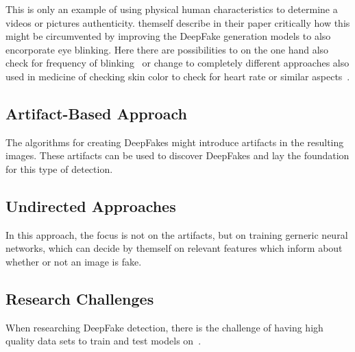 \par
This is only an example of using physical human characteristics to determine a
videos or pictures authenticity. \textcite{li_ictu_2018} themself describe in 
their paper critically how this might be circumvented by improving the DeepFake
generation models to also encorporate eye blinking. Here there are possibilities
to on the one hand also check for frequency of blinking~\cite{li_ictu_2018} or 
change to completely different approaches also used in medicine of checking skin
color to check for heart rate or similar aspects~\cite{pishori_detecting_2020}.


\subsection{Artifact-Based Approach}
The algorithms for creating DeepFakes might introduce artifacts in the resulting
images. These artifacts can be used to discover DeepFakes and lay the foundation for
this type of detection.

\subsection{Undirected Approaches}
In this approach, the focus is not on the artifacts, but on training gerneric
neural networks, which can decide by themself on relevant
features which inform about whether or not an image is fake.

\subsection{Research Challenges}
When researching DeepFake detection, there is the challenge of having high
quality data sets to train and test models on~\cite{li_celeb-df_2019}.
